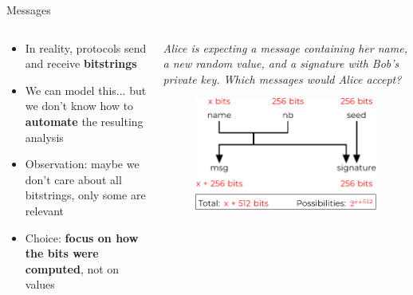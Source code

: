 \documentclass[11pt,aspectratio=169]{beamer}
\begin{document}
\begin{frame}[fragile]{Messages}
    \begin{columns}
        \begin{column}{0.5\textwidth}
            \begin{itemize}
                \item In reality, protocols send and receive \textbf{bitstrings}
                \item We can model this... but we don't know how to
                      \textbf{automate} the resulting analysis
                \item Observation: maybe we don't care about all bitstrings, 
                      only some are relevant
                \item Choice: \textbf{focus on how the bits were computed}, not 
                      on values
            \end{itemize}
        \end{column}
        \vsep
        \begin{column}{0.5\textwidth}
            \footnotesize\textit{
                Alice is expecting a message containing her name, a new random 
                value, and a signature with Bob's private key. Which messages 
                would Alice accept?
            }
            \begin{figure}
                \vspace*{.4cm}
                \includegraphics[width=.8\textwidth]
                    {./figures/lecture_1/signature_example}
                \vspace*{-.4cm}
            \end{figure}
        \end{column}
    \end{columns}
\end{frame}
\end{document}

